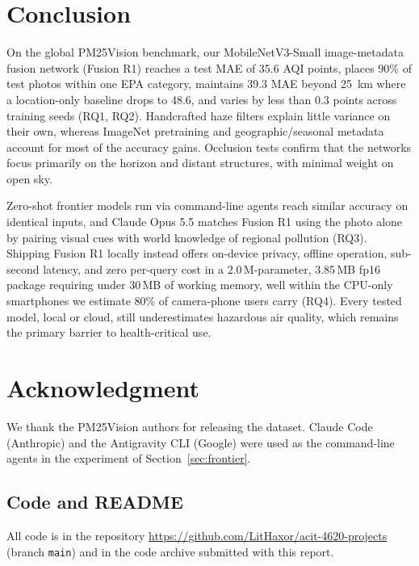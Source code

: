\documentclass[conference]{IEEEtran}
\begin{document}
\section{Conclusion}\label{sec:conclusion}

On the global PM25Vision benchmark, our MobileNetV3-Small image-metadata fusion
network (Fusion R1) reaches a test MAE of 35.6 AQI points, places 90\% of test
photos within one EPA category, maintains 39.3 MAE beyond 25~km where a
location-only baseline drops to 48.6, and varies by less than 0.3 points across
training seeds (RQ1, RQ2). Handcrafted haze filters explain little variance on
their own, whereas ImageNet pretraining and geographic/seasonal metadata account
for most of the accuracy gains. Occlusion tests confirm that the networks focus
primarily on the horizon and distant structures, with minimal weight on open
sky.

Zero-shot frontier models run via command-line agents reach similar accuracy on
identical inputs, and Claude Opus 5.5 matches Fusion R1 using the photo alone
by pairing visual cues with world knowledge of regional pollution (RQ3).
Shipping Fusion R1 locally instead offers on-device privacy, offline operation,
sub-second latency, and zero per-query cost in a 2.0\,M-parameter, 3.85\,MB
fp16 package requiring under 30\,MB of working memory, well within the CPU-only
smartphones we estimate 80\% of camera-phone users carry (RQ4). Every tested
model, local or cloud, still underestimates hazardous air quality, which
remains the primary barrier to health-critical use.

\section*{Acknowledgment}
We thank the PM25Vision authors for releasing the dataset. Claude Code
(Anthropic) and the Antigravity CLI (Google) were used as the command-line
agents in the experiment of Section~\ref{sec:frontier}.




\appendix

\subsection{Code and README}
All code is in the repository
\url{https://github.com/LitHaxor/acit-4620-projects} (branch \texttt{main}) and
in the code archive submitted with this report.
\end{document}
